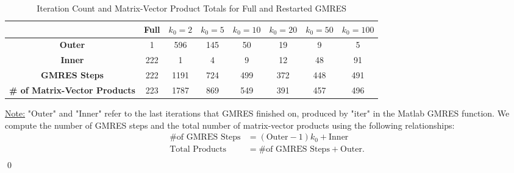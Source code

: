 \documentclass[12pt]{article}
\begin{document}
\begin{table}[H]
\renewcommand{\arraystretch}{1.3}
\hspace{-.2in}
\begin{small}
\begin{tabular}{| c || c | c | c | c | c | c | c |}
\hline
  & Full &  $k_0=2$ & $k_0=5$ & $k_0=10$ & $k_0=20$ & $k_0=50$ & $k_0=100$ \\
\hline 
\hline
\textbf{Outer} & 1 & 596 & 145 & 50 & 19 & 9 & 5 \\
\textbf{Inner} & 222 & 1 & 4 & 9 & 12 & 48 & 91 \\
\hline
\textbf{GMRES Steps} & 222 & 1191 & 724 & 499 & 372 & 448 & 491 \\
\textbf{\# of Matrix-Vector Products} & 223 & 1787 & 869 & 549 & 391 & 457 & 496 \\
\hline
\end{tabular}
\end{small}
\caption{Iteration Count and Matrix-Vector Product Totals for Full and Restarted GMRES}
\end{table} 
\noindent
\underline{Note:} "Outer" and "Inner" refer to the last iterations that GMRES finished on, produced by "iter" in the Matlab GMRES function.  We compute the number of GMRES steps and the total number of matrix-vector products using the following relationships:
\begin{align*}
\text{\# of GMRES Steps} &= (\text{Outer}-1)k_0 + \text{Inner} \\
\text{Total Products} &= \text{\# of GMRES Steps} + \text{Outer}. \\
\end{align*}
\qed\\
\end{document}
